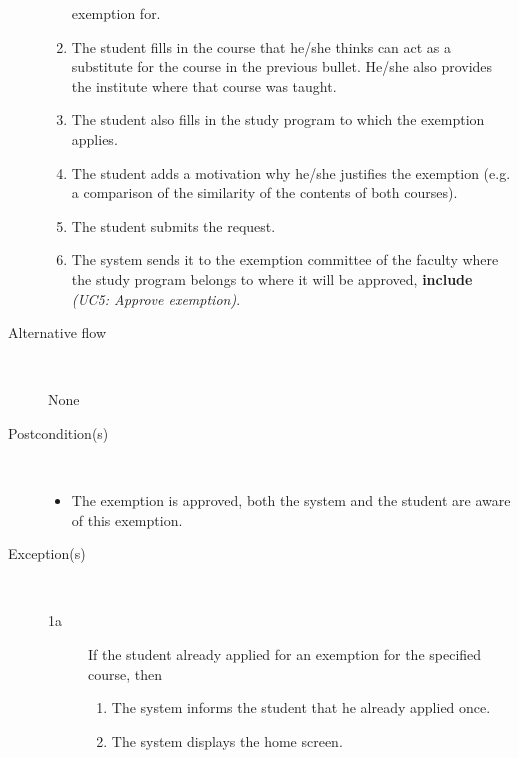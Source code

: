 \begin{description}
\begin{enumerate}
	  	exemption for.
	  	\item The student fills in the course that he/she thinks can act as a
	  	substitute for the course in the previous bullet. He/she also provides the
	  	institute where that course was taught.
	  	\item The student also fills in the study program to which the exemption
	  	applies.
	  	\item The student adds a motivation why he/she justifies the exemption (e.g.
	  	a comparison of the similarity of the contents of both courses).
	  	\item The student submits the request.
	  	\item The system sends it to the exemption committee of the faculty where
	  	the study program belongs to where it will be approved, \textbf{include}
	  	\emph{(UC5: Approve exemption)}.
	\end{enumerate}
	\item[Alternative flow] \
		\par None
	\item[Postcondition(s)] \ 
	\begin{itemize}
		\item The exemption is approved, both the system and the student are aware of
		this exemption.
	\end{itemize}
	\item[Exception(s)] \ 
	\begin{description}
		\item[1a] If the student already applied for an exemption for the specified
		course, then
		\begin{enumerate}
		  \item The system informs the student that he already applied once.
		  \item The system displays the home screen.
		\end{enumerate}
	\end{description}
\end{description}
